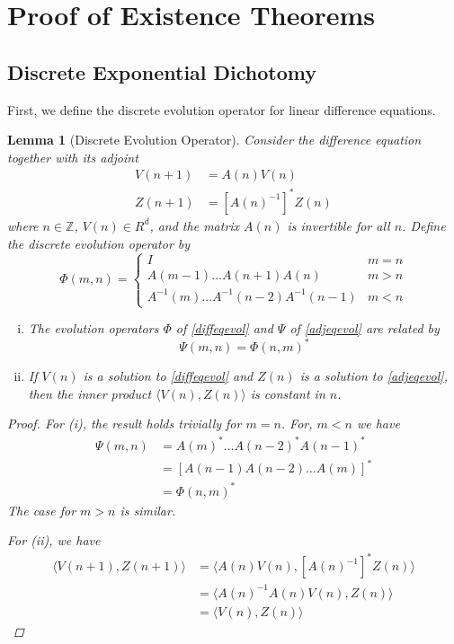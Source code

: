 \documentclass[12pt]{article}
\def\Z{{\mathbb Z}}
\newtheorem{lemma}{Lemma}
\begin{document}
\section{Proof of Existence Theorems}

\subsection{Discrete Exponential Dichotomy}

First, we define the discrete evolution operator for linear difference equations.

\begin{lemma}[Discrete Evolution Operator]\label{evolop}
Consider the difference equation together with its adjoint
\begin{align}
V(n+1) &= A(n) V(n) \label{diffeqevol} \\
Z(n+1) &= [A(n)^{-1}]^* Z(n) \label{adjeqevol}
\end{align}
where $n \in \Z$, $V(n) \in R^d$, and the matrix $A(n)$ is invertible for all $n$. Define the discrete evolution operator by
\begin{equation}\label{evol}
\Phi(m, n) = 
\begin{cases}
I & m = n \\
A(m-1) \dots A(n+1) A(n) & m > n \\
A^{-1}(m) \dots A^{-1}(n-2) A^{-1}(n-1) & m < n
\end{cases}
\end{equation}
\begin{enumerate}[(i)]
\item The evolution operators $\Phi$ of \eqref{diffeqevol} and $\Psi$ of \eqref{adjeqevol} are related by
\begin{equation}\label{adjevol}
\Psi(m, n) = \Phi(n, m)^*
\end{equation}
\item If $V(n)$ is a solution to \eqref{diffeqevol} and $Z(n)$ is a solution to \eqref{adjeqevol}, then the inner product $\langle V(n), Z(n) \rangle$ is constant in $n$.
\end{enumerate}

\begin{proof}
For (i), the result holds trivially for $m = n$. For, $m < n$ we have
\begin{align*}
\Psi(m, n) &= A(m)^* \dots A(n-2)^* A(n-1)^* \\
&= [A(n-1) A(n-2) \dots A(m)]^* \\
&= \Phi(n, m)^*
\end{align*}
The case for $m > n$ is similar.

For (ii), we have
\begin{align*}
\langle V(n+1), Z(n+1) \rangle &= 
\langle A(n) V(n), [A(n)^{-1}]^* Z(n) \rangle \\
&= \langle A(n)^{-1} A(n) V(n), Z(n) \rangle \\
&= \langle V(n), Z(n) \rangle
\end{align*}
\end{proof}
\end{lemma}
\end{document}
